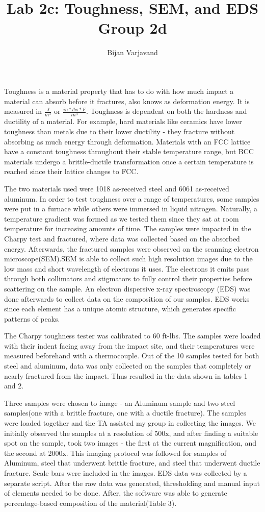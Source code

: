 \documentclass{article}
\author{Bijan Varjavand}
\title{Lab 2c: Toughness, SEM, and EDS\\Group 2d}
\begin{document}
\maketitle

\clearpage

Toughness is a material property that has to do with how much impact a material can absorb before it fractures, also knows as deformation energy. It is measured in $\frac{J}{m^3}$ or $\frac{in*lbs*F}{in^3}$. Toughness is dependent on both the hardness and ductility of a material. For example, hard materials like ceramics have lower toughness than metals due to their lower ductility - they fracture without absorbing as much energy through deformation. Materials with an FCC lattice have a constant toughness throughout their stable temperature range, but BCC materials undergo a brittle-ductile transformation once a certain temperature is reached since their lattice changes to FCC.

The two materials used were 1018 as-received steel and 6061 as-received aluminum. In order to test toughness over a range of temperatures, some samples were put in a furnace while others were immersed in liquid nitrogen. Naturally, a temperature gradient was formed as we tested them since they sat at room temperature for increasing amounts of time. The samples were impacted in the Charpy test and fractured, where data was collected based on the absorbed energy. Afterwards, the fractured samples were observed on the scanning electron microscope(SEM).SEM is able to collect such high resolution images due to the low mass and short wavelength of electrons it uses. The electrons it emits pass through both collimators and stigmators to fully control their properties before scattering on the sample. An electron dispersive x-ray spectroscopy (EDS) was done afterwards to collect data on the composition of our samples. EDS works since each element has a unique atomic structure, which generates specific patterns of peaks.

The Charpy toughness tester was calibrated to 60 ft-lbs. The samples were loaded with their indent facing away from the impact site, and their temperatures were measured beforehand with a thermocouple. Out of the 10 samples tested for both steel and aluminum, data was only collected on the samples that completely or nearly fractured from the impact. Thus resulted in the data shown in tables 1 and 2. 

Three samples were chosen to image - an Aluminum sample and two steel samples(one with a brittle fracture, one with a ductile fracture). The samples were loaded together and the TA assisted my group in collecting the images. We initially observed the samples at a resolution of 500x, and after finding a suitable spot on the sample, took two images - the first at the current magnification, and the second at 2000x. This imaging protocol was followed for samples of Aluminum, steel that underwent brittle fracture, and steel that underwent ductile fracture. Scale bars were included in the images. EDS data was collected by a separate script. After the raw data was generated, thresholding and manual input of elements needed to be done. After, the software was able to generate percentage-based composition of the material(Table 3).
\end{document}

